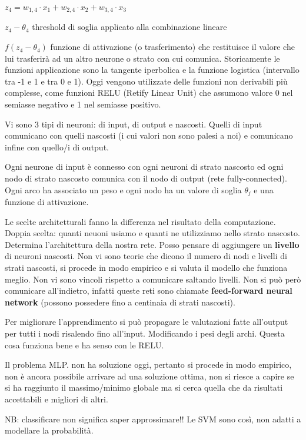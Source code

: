 \documentclass[12pt, a4paper,titlepage,openany]{article}
\begin{document}
$z_4 = w_{1,4} \cdot x_1 + w_{2,4} \cdot x_2 +w_{3,4} \cdot x_3$

$z_4 - \theta_4$ threshold di soglia applicato alla combinazione lineare

$f(z_4 - \theta_4)$ funzione di attivazione (o trasferimento) che restituisce il valore che lui trasferir\`a ad un altro neurone o strato con cui comunica. Storicamente le funzioni applicazione sono la tangente iperbolica e la funzione logistica (intervallo tra -1 e 1 e tra 0 e 1). Oggi vengono utilizzate delle funzioni non derivabili pi\`u complesse, come funzioni RELU (Retify Linear Unit) che assumono valore 0 nel semiasse negativo e 1 nel semiasse positivo.

Vi sono 3 tipi di neuroni: di input, di output e nascosti. Quelli di input comunicano con quelli nascosti (i cui valori non sono palesi a noi) e comunicano infine con quello/i di output. 

Ogni neurone di input \`e connesso con ogni neuroni di strato nascosto  ed ogni nodo di strato nascosto comunica con il nodo di output (rete fully-connected). Ogni arco ha associato un peso e ogni nodo ha un valore di soglia $\theta_j$ e una funzione di attivazione. 

Le scelte architetturali fanno la differenza nel risultato della computazione. Doppia scelta: quanti neuoni usiamo e quanti ne utilizziamo nello strato nascosto. Determina l'architettura della nostra rete. Posso pensare di aggiungere un \textbf{livello} di neuroni nascosti. Non vi sono teorie che dicono il numero di nodi e livelli di strati nascosti, si procede in modo empirico e si valuta il modello che funziona meglio. Non vi sono vincoli rispetto a comunicare saltando livelli. Non si pu\`o per\`o comunicare all'indietro, infatti queste reti sono chiamate \textbf{feed-forward neural network} (possono possedere fino a centinaia di strati nascosti).

Per migliorare l'apprendimento si pu\`o propagare le valutazioni fatte all'output per tutti i nodi risalendo fino all'input. Modificando i pesi degli archi. Questa cosa funziona bene e ha senso con le RELU.

Il problema MLP. non ha soluzione oggi, pertanto si procede in modo empirico, non \`e ancora possibile arrivare ad una soluzione ottima, non si riesce a capire se si ha raggiunto il massimo/minimo globale ma si cerca quella che da risultati accettabili e migliori di altri. 

NB: classificare non significa saper approssimare!! Le SVM sono cos\`i, non adatti a modellare la probabilit\`a.
\end{document}
